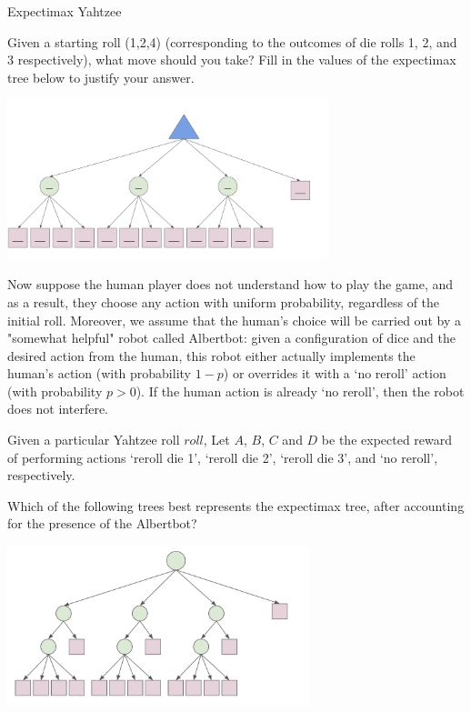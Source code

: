 \begin{problem}{Expectimax Yahtzee}
\begin{question}
\begin{subquestion}[3]
\end{subquestion}
\newpage
\begin{subquestion}[7]
Given a starting roll (1,2,4) (corresponding to the outcomes of die rolls 1, 2, and 3 respectively), what move should you take? Fill in the values of the expectimax tree below to justify your answer.

\begin{center}
\includegraphics[width=0.7\textwidth]{figures/q1_graph.png}
\label{fig:expectimaxempty}
\end{center}

\end{subquestion}
 
\end{question}
\newpage
Now suppose the human player does not understand how to play the game, and as a result, they choose any action with uniform probability, regardless of the initial roll. Moreover, we assume that the human's choice will be carried out by a "somewhat helpful" robot called Albertbot: given a configuration of dice and the desired action from the human, this robot either actually implements the human's action (with probability $1-p$) or overrides it with a `no reroll' action (with probability $p > 0$). If the human action is already `no reroll', then the robot does not interfere.


\begin{question}
Given a particular Yahtzee roll $roll$, Let $A$, $B$, $C$ and $D$ be the expected reward of performing actions `reroll die 1', `reroll die 2', `reroll die 3', and `no reroll', respectively.




\begin{subquestion}[3]
Which of the following trees best represents the expectimax tree, after accounting for the presence of the Albertbot?

\mcqs \includegraphics[width=250pt]{figures/q1_bot_a.png}


\end{subquestion}
\end{question}
\end{problem}
